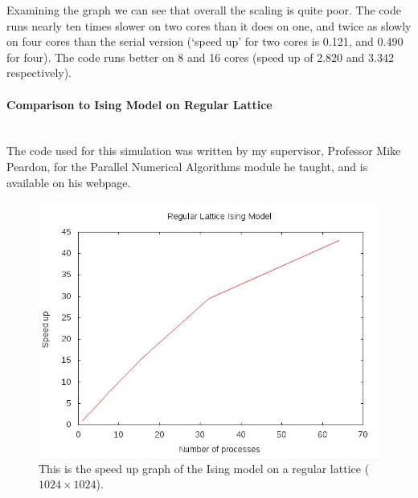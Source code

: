 \documentclass[pdftex,12pt,a4paper]{article}
\begin{document}
Examining the graph we can see that overall the scaling is quite poor. The code runs nearly ten times slower on two cores than it does on one, and twice as slowly on four cores than the serial version (`speed up' for two cores is 0.121, and 0.490 for four). The code runs better on 8 and 16 cores (speed up of 2.820 and 3.342 respectively). 

\paragraph{Comparison to Ising Model on Regular Lattice} ~\\

The code used for this simulation was written by my supervisor, Professor Mike Peardon, for the Parallel Numerical Algorithms module he taught, and is available on his webpage.

\begin{figure}
\centering
\includegraphics[scale=0.8]{ising_graph.jpg}
\caption{This is the speed up graph of the Ising model on a regular lattice ($1024 \times 1024$).}
\end{figure}
\end{document}
